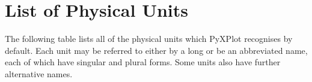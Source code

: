 %
%
%
%
%



\chapter{List of Physical Units}
\label{ch:unit_list}

The following table lists all of the physical units which PyXPlot recognises by
default. Each unit may be referred to either by a long or be an abbreviated
name, each of which have singular and plural forms. Some units also have
further alternative names.

